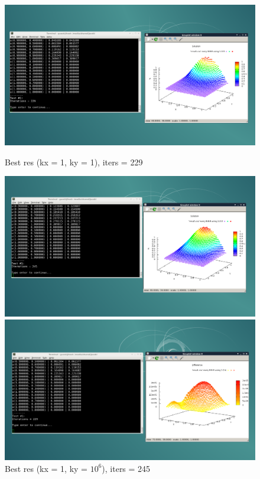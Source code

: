 \documentclass[a4paper, fleqn]{report}
\begin{document}
\newpage
\begin{figure}[h]
    \centering
    \begin{minipage}{0.49\textwidth}
        \centering
        \includegraphics[width=\textwidth]{media/best_res_1_1.png}
        \caption{Best res (kx = 1, ky = 1), iters = 229}
        \label{fig:best_res_1_1}
    \end{minipage}%
    \begin{minipage}{0.49\textwidth}
        \centering
        \includegraphics[width=\textwidth]{media/best_res_1_1000000.png}
        \caption{Best res (kx = 1, ky = $10^6$), iters = 245}
        \label{fig:best_res_1_1000000}
    \end{minipage}
    \par\bigskip
    \begin{minipage}{0.49\textwidth}
        \centering
        \includegraphics[width=\textwidth]{media/best_dif_1_1.png}

\end{minipage}
\end{figure}
\end{document}
